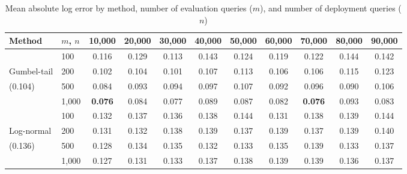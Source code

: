 \begin{table}[h]
\centering
\begin{tabular}{llccccccccc}
\toprule
Method & $m$, $n$ & 10,000 & 20,000 & 30,000 & 40,000 & 50,000 & 60,000 & 70,000 & 80,000 & 90,000 \\
\midrule
& 100 & 0.116 & 0.129 & 0.113 & 0.143 & 0.124 & 0.119 & 0.122 & 0.144 & 0.142 \\
Gumbel-tail & 200 & 0.102 & 0.104 & 0.101 & 0.107 & 0.113 & 0.106 & 0.106 & 0.115 & 0.123 \\
(0.104) & 500 & 0.084 & 0.093 & 0.094 & 0.097 & 0.107 & 0.092 & 0.096 & 0.090 & 0.106 \\
& 1,000 & \textbf{0.076} & 0.084 & 0.077 & 0.089 & 0.087 & 0.082 & \textbf{0.076} & 0.093 & 0.083 \\
\midrule
 & 100 & 0.132 & 0.137 & 0.136 & 0.138 & 0.144 & 0.131 & 0.138 & 0.139 & 0.144 \\
Log-normal & 200 & 0.131 & 0.132 & 0.138 & 0.139 & 0.137 & 0.139 & 0.137 & 0.139 & 0.140 \\
(0.136) & 500 & 0.128 & 0.134 & 0.135 & 0.132 & 0.133 & 0.135 & 0.139 & 0.133 & 0.137 \\
& 1,000 & 0.127 & 0.131 & 0.133 & 0.137 & 0.138 & 0.139 & 0.139 & 0.136 & 0.137 \\
\bottomrule
\end{tabular}
\caption{Mean absolute log error by method, number of evaluation queries ($m$), and number of deployment queries ($n$)}
\end{table}



